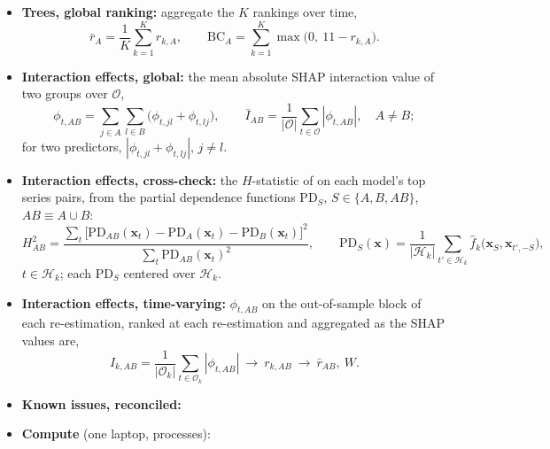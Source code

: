 \begin{itemize}
  of re-estimation $k$, then its rank,
  \[
    I_{k,A} = \frac{1}{|\mathcal O_k|} \sum_{t \in \mathcal O_k} |\phi_{t,A}|, \qquad
    r_{k,A} = 1 + \#\{A' : I_{k,A'} > I_{k,A}\} \quad \text{(ties averaged)}.
  \]
\item \textbf{Trees, global ranking:} aggregate the $K$ rankings over time,
  \[
    \bar r_A = \frac{1}{K} \sum_{k=1}^{K} r_{k,A}, \qquad
    \mathrm{BC}_A = \sum_{k=1}^{K} \max\bigl(0,\ 11 - r_{k,A}\bigr).
  \]
\item \textbf{Interaction effects, global:} the mean absolute SHAP interaction value of two groups over
  $\mathcal O$,
  \[
    \phi_{t,AB} = \sum_{j \in A} \sum_{l \in B} \bigl(\phi_{t,jl} + \phi_{t,lj}\bigr), \qquad
    \bar I_{AB} = \frac{1}{|\mathcal O|} \sum_{t \in \mathcal O} |\phi_{t,AB}|, \quad A \ne B;
  \]
  for two predictors, $|\phi_{t,jl} + \phi_{t,lj}|$, $j \ne l$.
\item \textbf{Interaction effects, cross-check:} the $H$-statistic of \citet{FriedmanPopescu2008} on each model's top
  \rhfiHTopSeries{} series pairs, from the partial dependence functions $\mathrm{PD}_S$, $S \in \{A, B, AB\}$,
  $AB \equiv A \cup B$:
  \[
    H^2_{AB} = \frac{\sum_{t} \bigl[\mathrm{PD}_{AB}(\bm x_t) - \mathrm{PD}_A(\bm x_t) - \mathrm{PD}_B(\bm x_t)\bigr]^2}
                    {\sum_{t} \mathrm{PD}_{AB}(\bm x_t)^2}, \qquad
    \mathrm{PD}_S(\bm x) = \frac{1}{|\mathcal H_k|} \sum_{t' \in \mathcal H_k} \hat f_k\bigl(\bm x_S, \bm x_{t',-S}\bigr),
  \]
  $t \in \mathcal H_k$; each $\mathrm{PD}_S$ centered over $\mathcal H_k$.
\item \textbf{Interaction effects, time-varying:} $\phi_{t,AB}$ on the out-of-sample block of each re-estimation,
  ranked at each re-estimation and aggregated as the SHAP values are,
  \[
    I_{k,AB} = \frac{1}{|\mathcal O_k|} \sum_{t \in \mathcal O_k} |\phi_{t,AB}| \ \to\ r_{k,AB} \ \to\ \bar r_{AB},\ W .
  \]
\item \textbf{Known issues, reconciled:}
\item \textbf{Compute} (one laptop, \rhfiWorkers{} processes):
\end{itemize}
\fi


